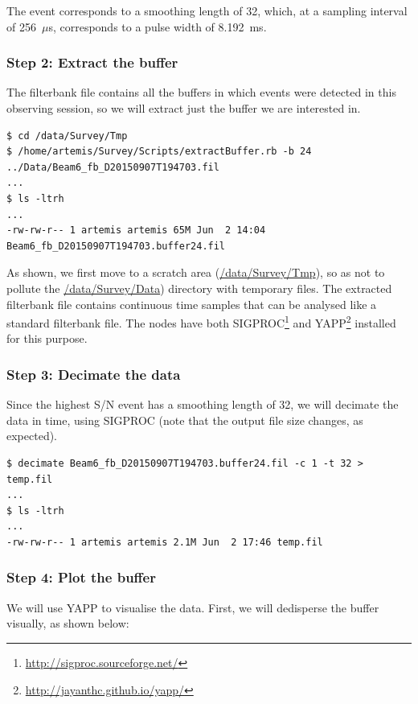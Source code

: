 \documentclass{article}
\begin{document}
The event corresponds to a smoothing length of 32, which, at a sampling
interval of 256~$\mu$s, corresponds to a pulse width of 8.192~ms.


\subsubsection*{Step 2: Extract the buffer}

The filterbank file \url{} contains all the buffers in which events were
detected in this observing session, so we will extract just the buffer we are
interested in.

\small{
\begin{verbatim}
$ cd /data/Survey/Tmp
$ /home/artemis/Survey/Scripts/extractBuffer.rb -b 24 ../Data/Beam6_fb_D20150907T194703.fil
...
$ ls -ltrh
...
-rw-rw-r-- 1 artemis artemis 65M Jun  2 14:04 Beam6_fb_D20150907T194703.buffer24.fil
\end{verbatim}
}

As shown, we first move to a scratch area (\url{/data/Survey/Tmp}), so as not
to pollute the \url{/data/Survey/Data}) directory with temporary files. The
extracted filterbank file contains continuous time samples that can be analysed
like a standard filterbank file. The nodes have both
SIGPROC\footnote{\url{http://sigproc.sourceforge.net/}} and
YAPP\footnote{\url{http://jayanthc.github.io/yapp/}} installed for this purpose.

\subsubsection*{Step 3: Decimate the data}

Since the highest S/N event has a smoothing length of 32, we will decimate the
data in time, using SIGPROC (note that the output file size changes, as
expected).

\small{
\begin{verbatim}
$ decimate Beam6_fb_D20150907T194703.buffer24.fil -c 1 -t 32 > temp.fil
...
$ ls -ltrh
...
-rw-rw-r-- 1 artemis artemis 2.1M Jun  2 17:46 temp.fil
\end{verbatim}
}


\subsubsection*{Step 4: Plot the buffer}

We will use YAPP to visualise the data. First, we will dedisperse the buffer
visually, as shown below:
\end{document}
